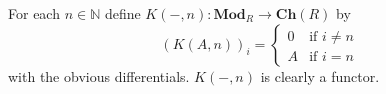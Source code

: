 \documentclass[a4paper]{memoir}
\theoremstyle{definition}
\theoremstyle{definition}
\theoremstyle{remark}
\newcommand{\N}{\mathbb{N}}
\newcommand{\ch}{\mathbf{Ch}}
\newcommand{\Mod}{\mathbf{Mod}}
\begin{document}
For each $n \in \N$ define $K(-,n) \colon \Mod_R \to \ch(R)$ by
\[
(K(A,n))_i = \begin{cases} 0 & \text{if } i \ne n \\ A & \text{if } i = n \end{cases}
\]
with the obvious differentials. $K(-,n)$ is clearly a functor.

\mainmatter














\appendix




\end{document}
